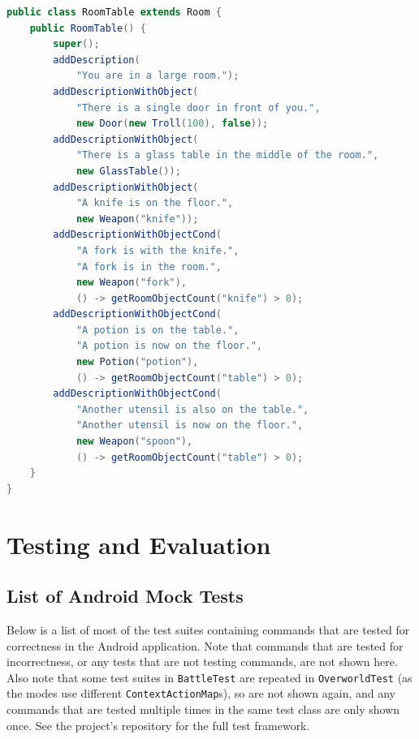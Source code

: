 \documentclass[11pt]{article}
\begin{document}
\begin{appendices}
\begin{lstlisting}[language=Java, label=lst:room-table-java]
public class RoomTable extends Room {
    public RoomTable() {
        super();
        addDescription(
            "You are in a large room.");
        addDescriptionWithObject(
            "There is a single door in front of you.",
            new Door(new Troll(100), false));
        addDescriptionWithObject(
            "There is a glass table in the middle of the room.",
            new GlassTable());
        addDescriptionWithObject(
            "A knife is on the floor.",
            new Weapon("knife"));
        addDescriptionWithObjectCond(
            "A fork is with the knife.",
            "A fork is in the room.",
            new Weapon("fork"),
            () -> getRoomObjectCount("knife") > 0);
        addDescriptionWithObjectCond(
            "A potion is on the table.",
            "A potion is now on the floor.",
            new Potion("potion"),
            () -> getRoomObjectCount("table") > 0);
        addDescriptionWithObjectCond(
            "Another utensil is also on the table.",
            "Another utensil is now on the floor.",
            new Weapon("spoon"),
            () -> getRoomObjectCount("table") > 0);
    }
}
\end{lstlisting}

\newpage
\section{Testing and Evaluation}
\subsection{List of Android Mock Tests}
\label{appendix:mock-tests}

Below is a list of most of the test suites containing commands that are tested for correctness in the Android application. Note that commands that are tested for incorrectness, or any tests that are not testing commands, are not shown here. Also note that some test suites in \texttt{BattleTest} are repeated in \texttt{OverworldTest} (as the modes use different \texttt{ContextActionMap}s), so are not shown again, and any commands that are tested multiple times in the same test class are only shown once. See the project's repository for the full test framework.


\end{appendices}
\end{document}
